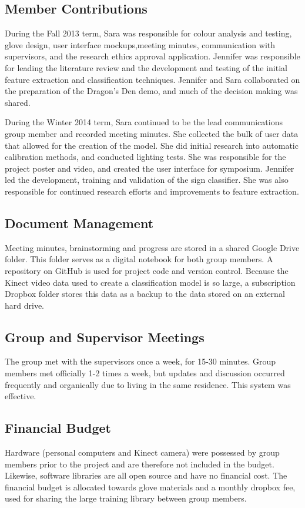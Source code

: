 \documentclass[12pt]{article}
\begin{document}
\subsection{Member Contributions}

During the Fall 2013 term, Sara was responsible for colour analysis and testing, glove design, user interface mockups,meeting minutes, communication with supervisors, and the research ethics approval application. Jennifer was responsible for leading the literature review and the development and testing of the initial feature extraction and classification techniques.
Jennifer and Sara collaborated on the preparation of the Dragon’s Den demo, and much of the
decision making was shared.

During the Winter 2014 term, Sara continued to be the lead communications group member and recorded meeting minutes. She collected the bulk of user data that allowed for the creation of the model. She did initial research into automatic calibration methods, and conducted lighting tests. She was responsible for the project poster and video, and created the user interface for symposium. Jennifer led the development, training and validation of the sign classifier. She was also responsible for continued research efforts and improvements to feature extraction.

\subsection{Document Management}
Meeting minutes, brainstorming and progress are stored in a shared Google Drive folder. This folder serves as a digital notebook for both group members. A repository on GitHub is used for project code and version control. Because the Kinect video data used to create a classification
model is so large, a subscription Dropbox folder stores this data as a backup to the data stored on an external hard drive.

\subsection{Group and Supervisor Meetings}
The group met with the supervisors once a week, for 15-30 minutes. Group members met officially 1-2 times a week, but updates and discussion occurred frequently and organically due to living in the same residence. This system was effective.

\subsection{Financial Budget}
Hardware (personal computers and Kinect camera) were possessed by group members prior to the project and are therefore not included in the budget. Likewise, software libraries are all open source and have no financial cost. The financial budget is allocated towards glove materials and a monthly dropbox fee, used for sharing the large training library between group members.
\end{document}
